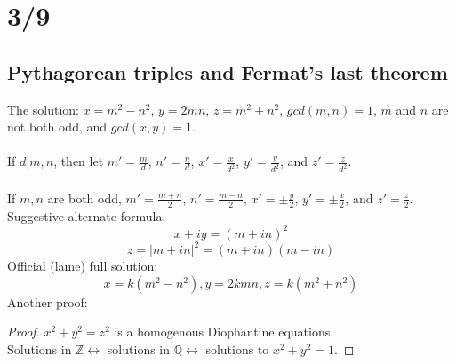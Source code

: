 \section*{3/9}
  \subsection*{Pythagorean triples and Fermat's last theorem}
    The solution: $x = m^2 - n^2$, $y = 2mn$, $z = m^2 + n^2$, $gcd(m,n) = 1$,
    $m$ and $n$ are not both odd, and $gcd(x,y) = 1$.\\\\
    If $d | m, n$, then let $m' = \frac{m}{d}$, $n' = \frac{n}{d}$, $x' = 
    \frac{x}{d^2}$, $y' = \frac{y}{d^2}$, and $z' = \frac{z}{d^2}$.\\\\
    If $m, n$ are both odd, $m' = \frac{m+n}{2}$, $n' = \frac{m-n}{2}$,
    $x' = \pm \frac{y}{2}$, $y' = \pm \frac{x}{2}$, and $z' = \frac{z}{2}$.\\
    Suggestive alternate formula:\\
    $$
      x + iy = (m + in)^2
    $$
    $$
      z = |m + in|^2 = (m+in)(m-in)
    $$
    Official (lame) full solution:\\
    $$
      x = k(m^2 - n^2), y = 2kmn, z = k(m^2 + n^2)
    $$
    Another proof:
    \begin{proof}
      $x^2 + y^2 = z^2$ is a homogenous Diophantine equations.\\
      Solutions in $\mathbb{Z} \leftrightarrow $ solutions in $\mathbb{Q} 
        \leftrightarrow$ solutions to $x^2 + y^2 = 1$.
    \end{proof}
